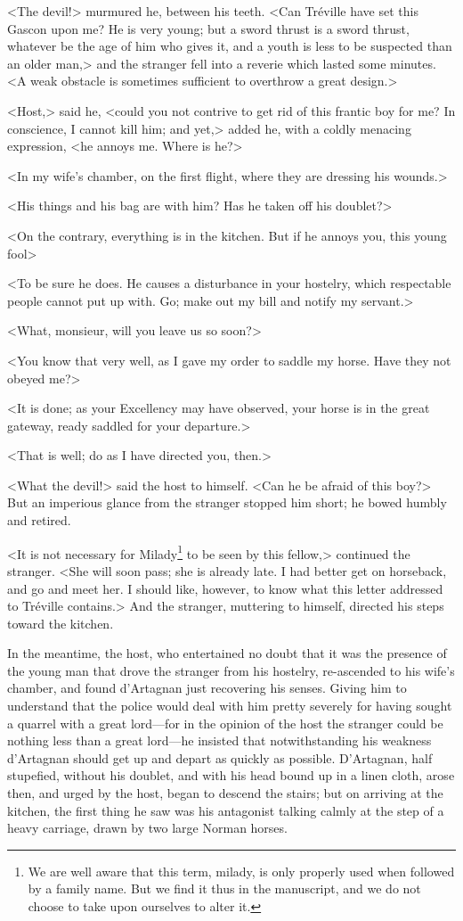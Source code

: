 <The devil!> murmured he, between his teeth. <Can Tréville have set this Gascon upon me? He is very young; but a sword thrust is a sword thrust, whatever be the age of him who gives it, and a youth is less to be suspected than an older man,> and the stranger fell into a reverie which lasted some minutes. <A weak obstacle is sometimes sufficient to overthrow a great design.>

<Host,> said he, <could you not contrive to get rid of this frantic boy for me? In conscience, I cannot kill him; and yet,> added he, with a coldly menacing expression, <he annoys me. Where is he?> 

<In my wife's chamber, on the first flight, where they are dressing his wounds.> 

<His things and his bag are with him? Has he taken off his doublet?> 

<On the contrary, everything is in the kitchen. But if he annoys you, this young fool\longdash> 

<To be sure he does. He causes a disturbance in your hostelry, which respectable people cannot put up with. Go; make out my bill and notify my servant.> 

<What, monsieur, will you leave us so soon?> 

<You know that very well, as I gave my order to saddle my horse. Have they not obeyed me?> 

<It is done; as your Excellency may have observed, your horse is in the great gateway, ready saddled for your departure.> 

<That is well; do as I have directed you, then.> 

<What the devil!> said the host to himself. <Can he be afraid of this boy?> But an imperious glance from the stranger stopped him short; he bowed humbly and retired. 

<It is not necessary for Milady\footnote{We are well aware that this term, milady, is only properly used when followed by a family name. But we find it thus in the manuscript, and we do not choose to take upon ourselves to alter it.} to be seen by this fellow,> continued the stranger. <She will soon pass; she is already late. I had better get on horseback, and go and meet her. I should like, however, to know what this letter addressed to Tréville contains.> And the stranger, muttering to himself, directed his steps toward the kitchen.

In the meantime, the host, who entertained no doubt that it was the presence of the young man that drove the stranger from his hostelry, re-ascended to his wife's chamber, and found d'Artagnan just recovering his senses. Giving him to understand that the police would deal with him pretty severely for having sought a quarrel with a great lord---for in the opinion of the host the stranger could be nothing less than a great lord---he insisted that notwithstanding his weakness d'Artagnan should get up and depart as quickly as possible. D'Artagnan, half stupefied, without his doublet, and with his head bound up in a linen cloth, arose then, and urged by the host, began to descend the stairs; but on arriving at the kitchen, the first thing he saw was his antagonist talking calmly at the step of a heavy carriage, drawn by two large Norman horses. 

